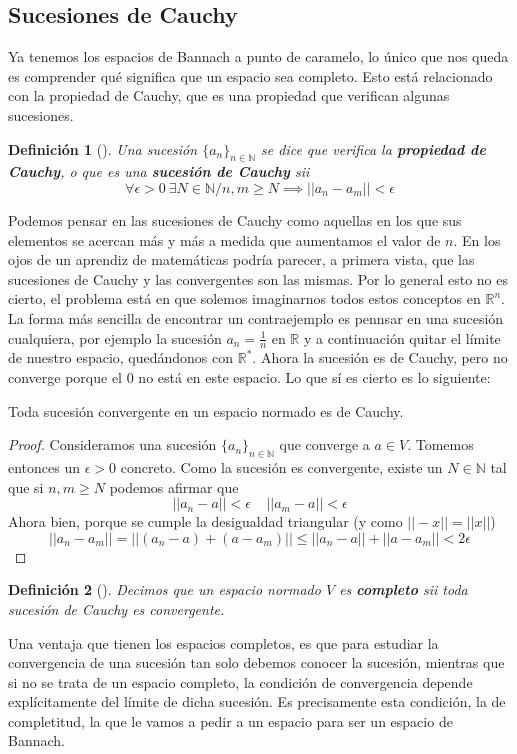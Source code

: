 \documentclass[12pt]{report}
\newtheorem{definition}{Definición}
\newenvironment{dft}[1][]
    {\begin{leftbar}\begin{definition}[#1]}
    {\end{definition}\end{leftbar}}
\begin{document}
\subsection{Sucesiones de Cauchy}
Ya tenemos los espacios de Bannach a punto de caramelo, lo único que nos queda es comprender qué significa que un espacio sea completo. Esto está relacionado con la propiedad de Cauchy, que es una propiedad que verifican algunas sucesiones.

\begin{dft}
Una sucesión $\{ a_n\}_{n\in\mathbb{N}}$ se dice que verifica la \textbf{propiedad de Cauchy}, o que es una \textbf{sucesión de Cauchy} sii 
$$\forall\epsilon >0\ \exists N\in\mathbb{N}/n,m\geq N\implies ||a_n-a_m||<\epsilon$$
\end{dft}
Podemos pensar en las sucesiones de Cauchy como aquellas en los que sus elementos se acercan más y más a medida que aumentamos el valor de $n$. En los ojos de un aprendiz de matemáticas podría parecer, a primera vista, que las sucesiones de Cauchy y las convergentes son las mismas. Por lo general esto no es cierto, el problema está en que solemos imaginarnos todos estos conceptos en $\mathbb{R}^n$. La forma más sencilla de encontrar un contraejemplo es pennsar en una sucesión cualquiera, por ejemplo la sucesión $a_n=\frac{1}{n}$ en $\mathbb{R}$ y a continuación quitar el límite de nuestro espacio, quedándonos con $\mathbb{R}^\ast$. Ahora la sucesión es de Cauchy, pero no converge porque el $0$ no está en este espacio. Lo que sí es cierto es lo siguiente:

\begin{thm}
Toda sucesión convergente en un espacio normado es de Cauchy.
\end{thm}
\begin{proof}
Consideramos una sucesión $\{ a_n\}_{n\in\mathbb{N}}$ que converge a $a\in V$. Tomemos entonces un $\epsilon >0$ concreto. Como la sucesión es convergente, existe un $N\in\mathbb{N}$ tal que si $n,m\geq N$ podemos afirmar que
$$||a_n-a||<\epsilon\ \ \ \ \ ||a_m-a||<\epsilon$$
Ahora bien, porque se cumple la desigualdad triangular (y como $||-x||=||x||$)
$$||a_n-a_m||=||(a_n-a)+(a-a_m)||\leq ||a_n-a|| +||a-a_m||<2\epsilon$$
\end{proof}

\begin{dft}
Decimos que un espacio normado $V$ es \textbf{completo} sii toda sucesión de Cauchy es convergente.
\end{dft}
Una ventaja que tienen los espacios completos, es que para estudiar la convergencia de una sucesión tan solo debemos conocer la sucesión, mientras que si no se trata de un espacio completo, la condición de convergencia depende explícitamente del límite de dicha sucesión. Es precisamente esta condición, la de completitud, la que le vamos a pedir a un espacio para ser un espacio de Bannach.
\end{document}

